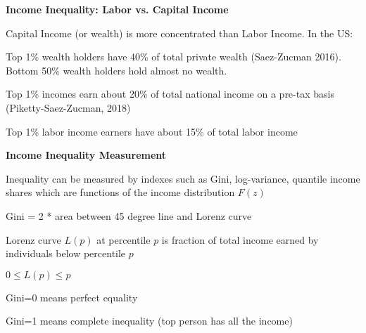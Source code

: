 \documentclass[landscape]{slides}
\begin{document}
\begin{slide}
\begin{center}
{\bf Income Inequality: Labor vs. Capital Income}
\end{center}

Capital Income (or wealth) is more concentrated than Labor
Income. In the US:

Top 1\% wealth holders have 40\% of total private wealth (Saez-Zucman 2016). Bottom 50\% wealth holders
hold almost no wealth.

Top 1\% incomes earn about 20\% of total national income on a pre-tax basis (Piketty-Saez-Zucman, 2018)

Top 1\% labor income earners have about 15\% of total labor income

\end{slide}





\begin{slide}
\begin{center}
{\bf Income Inequality Measurement}
\end{center}
Inequality can be measured by indexes such as Gini, log-variance,
quantile income shares which are functions of the income
distribution $F(z)$

Gini = 2 * area between 45 degree line and Lorenz curve

Lorenz curve $L(p)$ at percentile $p$ is fraction of total income
earned by individuals below percentile $p$

$0 \leq L(p) \leq p$

Gini=0 means perfect equality

Gini=1 means complete inequality (top person has all the income)


\end{slide}

\begin{slide}

\end{slide}
\end{document}
